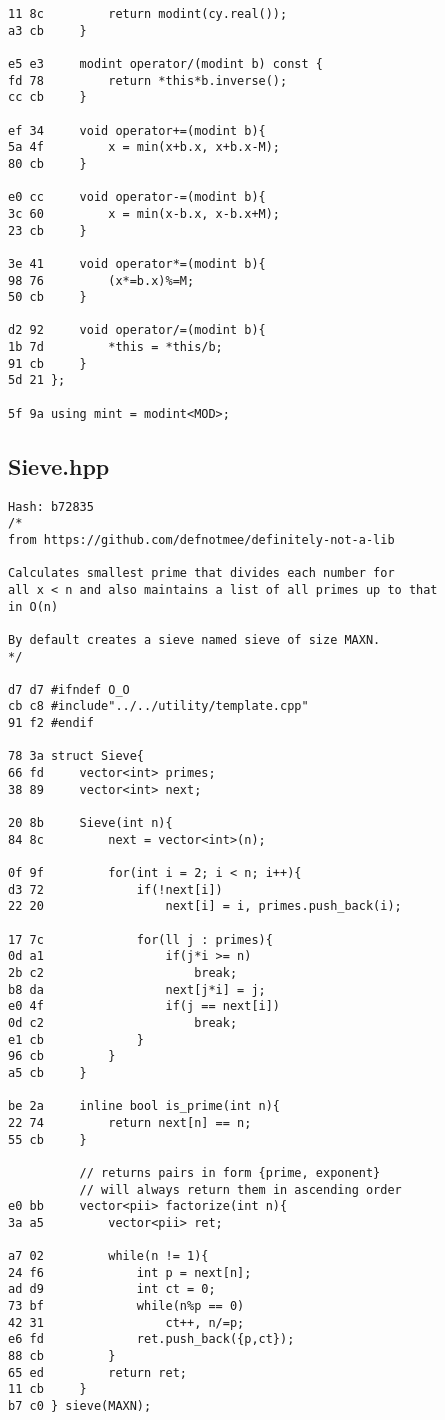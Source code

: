 \documentclass[11pt, a4paper, twoside]{article}
\begin{document}
\begin{lstlisting}
11 8c         return modint(cy.real());
a3 cb     }
      
e5 e3     modint operator/(modint b) const {
fd 78         return *this*b.inverse();
cc cb     }
      
ef 34     void operator+=(modint b){
5a 4f         x = min(x+b.x, x+b.x-M);
80 cb     }
      
e0 cc     void operator-=(modint b){
3c 60         x = min(x-b.x, x-b.x+M);
23 cb     }
          
3e 41     void operator*=(modint b){
98 76         (x*=b.x)%=M;
50 cb     }
      
d2 92     void operator/=(modint b){
1b 7d         *this = *this/b;
91 cb     }
5d 21 };

5f 9a using mint = modint<MOD>;
\end{lstlisting}

\subsection{Sieve.hpp}
\begin{lstlisting}
Hash: b72835
/*
from https://github.com/defnotmee/definitely-not-a-lib

Calculates smallest prime that divides each number for
all x < n and also maintains a list of all primes up to that
in O(n)

By default creates a sieve named sieve of size MAXN.
*/

d7 d7 #ifndef O_O
cb c8 #include"../../utility/template.cpp"
91 f2 #endif

78 3a struct Sieve{
66 fd     vector<int> primes;
38 89     vector<int> next;
      
20 8b     Sieve(int n){
84 8c         next = vector<int>(n);
      
0f 9f         for(int i = 2; i < n; i++){
d3 72             if(!next[i])
22 20                 next[i] = i, primes.push_back(i);
                  
17 7c             for(ll j : primes){
0d a1                 if(j*i >= n)
2b c2                     break;
b8 da                 next[j*i] = j;
e0 4f                 if(j == next[i])
0d c2                     break;
e1 cb             }
96 cb         }
a5 cb     }
      
be 2a     inline bool is_prime(int n){
22 74         return next[n] == n;
55 cb     }
      
          // returns pairs in form {prime, exponent}
          // will always return them in ascending order
e0 bb     vector<pii> factorize(int n){
3a a5         vector<pii> ret;
      
a7 02         while(n != 1){
24 f6             int p = next[n];
ad d9             int ct = 0;
73 bf             while(n%p == 0)
42 31                 ct++, n/=p;
e6 fd             ret.push_back({p,ct});
88 cb         }
65 ed         return ret;
11 cb     }
b7 c0 } sieve(MAXN);
\end{lstlisting}
\end{document}
